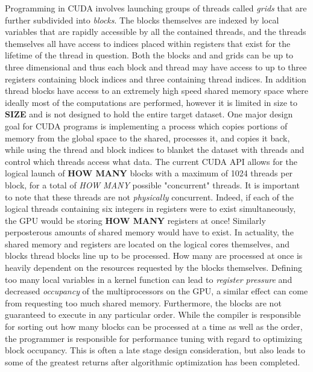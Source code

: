 Programming in CUDA involves launching groups of threads called \textit{grids} that are further subdivided into \textit{blocks}. The blocks themselves are indexed by local variables that are rapidly accessible by all the contained threads, and the threads themselves all have access to indices placed within registers that exist for the lifetime of the thread in question. Both the blocks and and grids can be up to three dimensional and thus each block and thread may have access to up to three registers containing block indices and three containing thread indices. In addition thread blocks have access to an extremely high speed shared memory space where ideally most of the computations are performed, however it is limited in size to \textbf{SIZE} and is not designed to hold the entire target dataset. One major design goal for CUDA programs is implementing a process which copies portions of memory from the global space to the shared, processes it, and copies it back, while using the thread and block indices to blanket the dataset with threads and control which threads access what data. The current CUDA API allows for the logical launch of \textbf{HOW MANY} blocks with a maximum of 1024 threads per block, for a total of \textit{HOW MANY} possible "concurrent" threads. It is important to note that these threads are not \textit{physically} concurrent. Indeed, if each of the logical threads containing six integers in registers were to exist simultaneously, the GPU would be storing \textbf{HOW MANY} registers at once! Similarly perposterous amounts of shared memory would have to exist. In actuality, the shared memory and registers are located on the logical cores themselves, and blocks thread blocks line up to be processed. How many are processed at once is heavily dependent on the resources requested by the blocks themselves. Defining too many local variables in a kernel function can lead to \textit{register pressure} and decreased \textit{occupancy} of the multiprocessors on the GPU, a similar effect can come from requesting too much shared memory. Furthermore, the blocks are not guaranteed to execute in any particular order. While the compiler is responsible for sorting out how many blocks can be processed at a time as well as the order, the programmer is responsible for performance tuning with regard to optimizing block occupancy. This is often a late stage design consideration, but also leads to some of the greatest returns after algorithmic optimization has been completed.    



